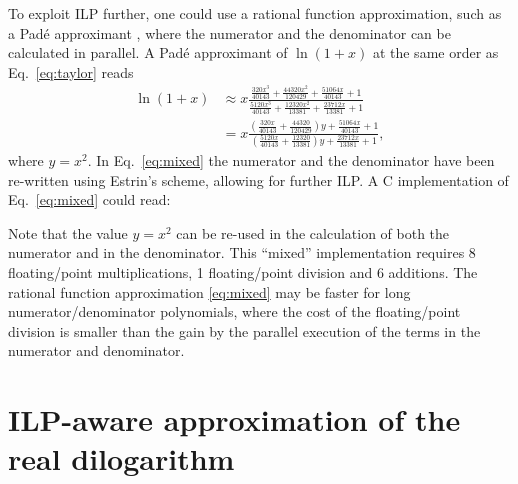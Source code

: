 \documentclass[10pt,DIV16,twocolumn,numbers=noenddot]{scrartcl}
\begin{document}
To exploit ILP further, one could use a rational function
approximation, such as a Padé approximant \cite{pade}, where the
numerator and the denominator can be calculated in parallel.  A Padé
approximant of $\ln(1+x)$ at the same order as Eq.~\eqref{eq:taylor}
reads
%
\begin{align}
  \ln(1+x) &\approx x
  \frac{\frac{320 x^3}{40143}+\frac{44320 x^2}{120429}+\frac{51064
    x}{40143}+1}{\frac{5120 x^3}{40143}+\frac{12320 x^2}{13381}+\frac{23712
    x}{13381}+1}
  \label{eq:pade}
  \\
  &= x
  \frac{\left(\frac{320 x}{40143}+\frac{44320}{120429}\right)y+\frac{51064
    x}{40143}+1}{\left(\frac{5120 x}{40143}+\frac{12320}{13381}\right)y+\frac{23712
    x}{13381}+1},
  \label{eq:mixed}
\end{align}
%
where $y=x^2$.  In Eq.~\eqref{eq:mixed} the numerator and the
denominator have been re-written using Estrin's scheme, allowing for
further ILP.  A C implementation of Eq.~\eqref{eq:mixed} could read:
%

%
Note that the value $y=x^2$ can be re-used in the calculation of both
the numerator and in the denominator.  This ``mixed'' implementation
requires 8 floating\-/point multiplications, 1 floating\-/point
division and 6 additions.  The rational function approximation
\eqref{eq:mixed} may be faster for long numerator/denominator
polynomials, where the cost of the floating\-/point division is
smaller than the gain by the parallel execution of the terms in the
numerator and denominator.


\section{ILP-aware approximation of the real dilogarithm}
\label{sec:algorithm}
\end{document}
